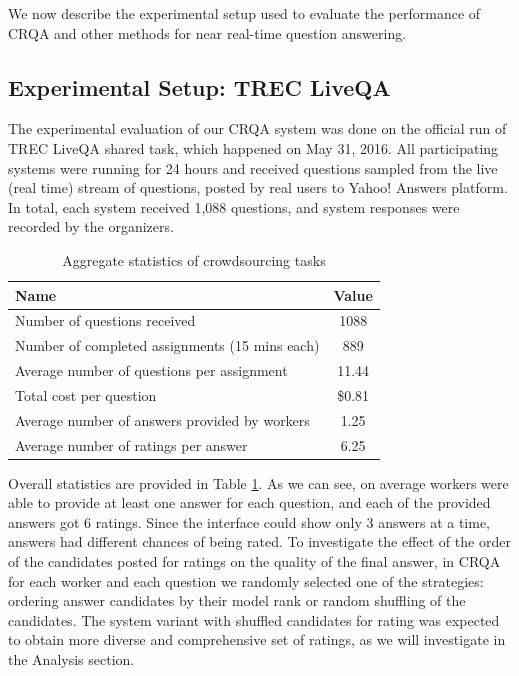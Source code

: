 We now describe the experimental setup used to evaluate the performance of CRQA and other methods for near real-time question answering.

\subsection{Experimental Setup: TREC LiveQA}
The experimental evaluation of our CRQA system was done on the official run of TREC LiveQA shared task, which happened on May 31, 2016.
All participating systems were running for 24 hours and received questions sampled from the live (real time) stream of questions, posted by real users to Yahoo! Answers platform.
In total, each system received 1,088 questions, and system responses were recorded by the organizers.

\begin{table}[ht]
\centering
\begin{tabular}{| p{7cm} | c | }
\hline
Name & Value \\
\hline
Number of questions received & 1088 \\
Number of completed assignments (15 mins each) & 889 \\
Average number of questions per assignment & 11.44 \\
Total cost per question & \$0.81 \\
Average number of answers provided by workers & 1.25 \\
Average number of ratings per answer & 6.25 \\
\hline
\end{tabular}
\caption{Aggregate statistics of crowdsourcing tasks}
\label{table:task_stats}
\end{table}

Overall statistics are provided in Table \ref{table:task_stats}.
As we can see, on average workers were able to provide at least one answer for each question, and each of the provided answers got 6 ratings.
Since the interface could show only 3 answers at a time, answers had different chances of being rated.
To investigate the effect of the order of the candidates posted for ratings on the quality of the final answer, in CRQA for each worker and each question we randomly selected one of the strategies: ordering answer candidates by their model rank or random shuffling of the candidates.
The system variant with shuffled candidates for rating was expected to obtain more diverse and comprehensive set of ratings, as we will investigate in the Analysis section.

